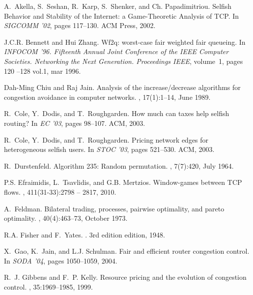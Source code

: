 \documentclass[letterpaper,10pt]{llncs}
\begin{document}
\begin{thebibliography}{1}

A.~Akella, S.~Seshan, R.~Karp, S.~Shenker, and Ch. Papadimitriou.
\newblock Selfish {Behavior} and {Stability} of the {Internet}: a
  {Game}-{Theoretic} {Analysis} of {TCP}.
\newblock In {\em SIGCOMM '02}, pages 117--130. ACM Press, 2002.

J.C.R. Bennett and Hui Zhang.
\newblock Wf2q: worst-case fair weighted fair queueing.
\newblock In {\em INFOCOM '96. Fifteenth Annual Joint Conference of the IEEE
  Computer Societies. Networking the Next Generation. Proceedings IEEE},
  volume~1, pages 120 --128 vol.1, mar 1996.

Dah-Ming Chiu and Raj Jain.
\newblock Analysis of the increase\slash decrease algorithms for congestion
  avoidance in computer networks.
, 17(1):1--14, June 1989.

R.~Cole, Y.~Dodis, and T.~Roughgarden.
\newblock How much can taxes help selfish routing?
\newblock In {\em EC '03}, pages 98--107. ACM, 2003.

R.~Cole, Y.~Dodis, and T.~Roughgarden.
\newblock Pricing network edges for heterogeneous selfish users.
\newblock In {\em STOC '03}, pages 521--530. ACM, 2003.

R.~Durstenfeld.
\newblock Algorithm 235: Random permutation.
, 7(7):420, July 1964.

P.S. Efraimidis, L.~Tsavlidis, and G.B. Mertzios.
\newblock Window-games between {TCP} flows.
, 411(31-33):2798 -- 2817, 2010.

A.~Feldman.
\newblock Bilateral trading, processes, pairwise optimality, and pareto
  optimality.
, 40(4):463--73, October 1973.

R.A. Fisher and F.~Yates.
.
\newblock 3rd edition edition, 1948.

X.~Gao, K.~Jain, and L.J. Schulman.
\newblock Fair and efficient router congestion control.
\newblock In {\em SODA '04}, pages 1050--1059, 2004.

R.~J. Gibbens and F.~P. Kelly.
\newblock Resource pricing and the evolution of congestion control.
, 35:1969--1985, 1999.


\end{thebibliography}
\end{document}
